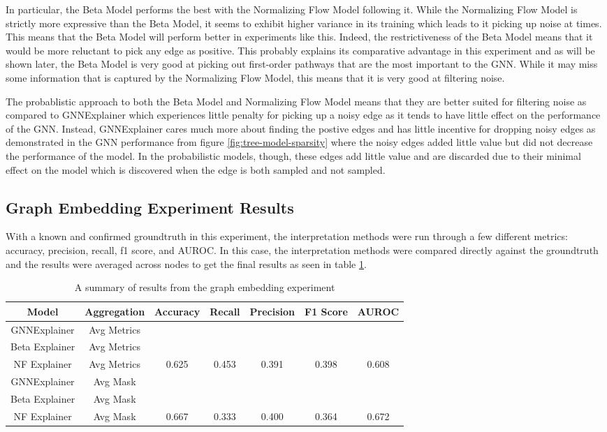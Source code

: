 In particular, the Beta Model performs the best with the Normalizing Flow Model following it. While the Normalizing Flow Model is strictly more expressive than the Beta Model, it seems to exhibit higher variance in its training which leads to it picking up noise at times. This means that the Beta Model will perform better in experiments like this. Indeed, the restrictiveness of the Beta Model means that it would be more reluctant to pick any edge as positive. This probably explains its comparative advantage in this experiment and as will be shown later, the Beta Model is very good at picking out first-order pathways that are the most important to the GNN. While it may miss some information that is captured by the Normalizing Flow Model, this means that it is very good at filtering noise. 

The probablistic approach to both the Beta Model and Normalizing Flow Model means that they are better suited for filtering noise as compared to GNNExplainer which experiences little penalty for picking up a noisy edge as it tends to have little effect on the performance of the GNN. Instead, GNNExplainer cares much more about finding the postive edges and has little incentive for dropping noisy edges as demonstrated in the GNN performance from figure \ref{fig:tree-model-sparsity} where the noisy edges added little value but did not decrease the performance of the model. In the probabilistic models, though, these edges add little value and are discarded due to their minimal effect on the model which is discovered when the edge is both sampled and not sampled. 

\subsection{Graph Embedding Experiment Results}
With a known and confirmed groundtruth in this experiment, the interpretation methods were run through a few different metrics: accuracy, precision, recall, f1 score, and AUROC. In this case, the interpretation methods were compared directly against the groundtruth and the results were averaged across nodes to get the final results as seen in table \ref{tab:graph-embed-result}.
\begin{table}[htb]
	\centering
	\begin{tabular}{|c|c||ccccc|}\hline
	Model & Aggregation & Accuracy & Recall & Precision & F1 Score & AUROC \\ \hline\hline
	GNNExplainer & Avg Metrics & & & & & \\
	Beta Explainer & Avg Metrics & & & & & \\
	NF Explainer & Avg Metrics & 0.625 & 0.453 & 0.391 & 0.398 & 0.608 \\ \hline
	GNNExplainer & Avg Mask & & & & &\\
	Beta Explainer & Avg Mask & & & & &\\
	NF Explainer & Avg Mask & 0.667 & 0.333 & 0.400 & 0.364 & 0.672 \\ \hline
	\end{tabular} 
	\caption{A summary of results from the graph embedding experiment}
	\label{tab:graph-embed-result}
\end{table}

